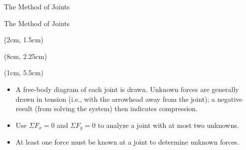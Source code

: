 \documentclass[9pt, xcolor={svgnames, x11names},professionalfonts]{beamer}
\def\scale{1}
\begin{document}

\begin{frame}{The Method of Joints}

	\hfill
	\mini[0.5]{
		\def\scale{0.75}
		
	}

\end{frame}


\begin{frame}{The Method of Joints}

	\begin{textblock*}{0.4\textwidth}(2cm, 1.5cm)
		\def\scale{0.65}
		
	\end{textblock*}
	\begin{textblock*}{0.4\textwidth}(8cm, 2.25cm)
		
	\end{textblock*}

	\begin{textblock*}{1\textwidth}(1cm, 5.5cm)
		\centering
		\begin{itemize}
			\item<1-> A free-body diagram of each joint is drawn. Unknown forces are generally drawn in tension (i.e., with the arrowhead away from the joint); a negative result (from solving the system) then indicates compression. \parm
			\item<2-> Use $\Sigma F_x = 0$ and $\Sigma F_y = 0$ to analyze a joint with at most two unknowns. \parm
			\item<3> At least one force must be known at a joint to determine unknown forces.
		\end{itemize}
	\end{textblock*}
\end{frame}
\end{document}
